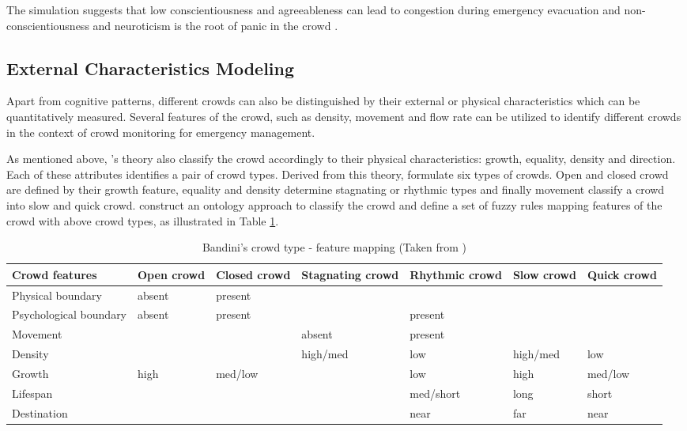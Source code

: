 The simulation suggests that low conscientiousness and agreeableness can lead to congestion during emergency evacuation and non-conscientiousness and neuroticism is the root of panic in the crowd \citep{Durupinar2008}.

\subsection{External Characteristics Modeling}

Apart from cognitive patterns, different crowds can also be distinguished by their external or physical characteristics which can be quantitatively measured. Several features of the crowd, such as density, movement and flow rate can be utilized to identify different crowds in the context of crowd monitoring for emergency management.

As mentioned above, \citet{Canetti1962}’s theory also classify the crowd accordingly to their physical characteristics: growth, equality, density and direction. Each of these attributes identifies a pair of crowd types. Derived from this theory, \citet{Bandini2011} formulate six types of crowds. Open and closed crowd are defined by their growth feature, equality and density determine stagnating or rhythmic types and finally movement classify a crowd into slow and quick crowd. \citet{Bandini2011} construct an ontology approach to classify the crowd and define a set of fuzzy rules mapping features of the crowd with above crowd types, as illustrated in Table \ref{table:bandiniCrowdType}.

\begin{table}
	\caption{Bandini's crowd type - feature mapping (Taken from \citet{Bandini2011})}
	\label{table:bandiniCrowdType}
	\centering
	\begin{tabular}{|p{2.5cm}|p{1.5cm}|p{1.5cm}|p{2cm}|p{2cm}|p{1.5cm}|p{1.5cm}|}
		\hline
		\textbf{Crowd features} & \textbf{Open crowd} & \textbf{Closed crowd} & \textbf{Stagnating crowd} & \textbf{Rhythmic crowd} & \textbf{Slow crowd} & \textbf{Quick crowd} \\
		\hline
		Physical boundary & absent & present & & & & \\
		\hline
		Psychological boundary & absent & present & & present & & \\
		\hline
		Movement & & & absent & present & & \\
		\hline
		Density & & & high/med & low & high/med & low \\
		\hline
		Growth & high & med/low & & low & high & med/low \\
		\hline
		Lifespan & & & & med/short & long & short \\
		\hline
		Destination & & & & near & far & near \\
		\hline
	\end{tabular}
\end{table}

